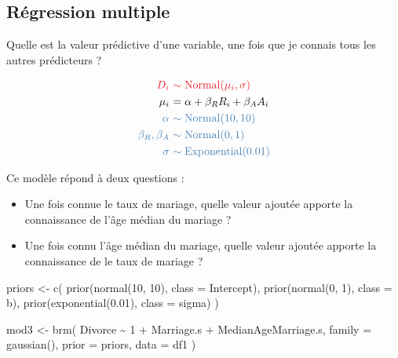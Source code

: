 \documentclass[
  a4paper,11pt,twoside,onecolumn,openright,final,oldfontcommands]{memoir}
\newenvironment{Shaded}{\begin{snugshade}}{\end{snugshade}}
\newcommand{\AttributeTok}[1]{\textcolor[rgb]{0.77,0.63,0.00}{#1}}
\newcommand{\DecValTok}[1]{\textcolor[rgb]{0.00,0.00,0.81}{#1}}
\newcommand{\FloatTok}[1]{\textcolor[rgb]{0.00,0.00,0.81}{#1}}
\newcommand{\FunctionTok}[1]{\textcolor[rgb]{0.00,0.00,0.00}{#1}}
\newcommand{\NormalTok}[1]{#1}
\newcommand{\OtherTok}[1]{\textcolor[rgb]{0.56,0.35,0.01}{#1}}
\newcommand{\SpecialCharTok}[1]{\textcolor[rgb]{0.00,0.00,0.00}{#1}}
\providecommand{\tightlist}{%
  \setlength{\itemsep}{0pt}\setlength{\parskip}{0pt}}
\theoremstyle{definition}
\theoremstyle{definition}
\theoremstyle{definition}
\theoremstyle{definition}
\theoremstyle{remark}
\begin{document}
\hypertarget{ruxe9gression-multiple-1}{%
\subsection{Régression multiple}\label{ruxe9gression-multiple-1}}

Quelle est la valeur prédictive d'une variable, une fois que je connais tous les autres prédicteurs ?

\[
\begin{aligned}
\color{orangered}{D_{i}} \ &\color{orangered}{\sim \mathrm{Normal}(\mu_{i}, \sigma)} \\
\color{black}{\mu_{i}} \ &\color{black}{= \alpha + \beta_{R}R_{i} + \beta_{A} A_{i}} \\
\color{steelblue}{\alpha} \ &\color{steelblue}{\sim \mathrm{Normal}(10, 10)} \\
\color{steelblue}{\beta_{R}, \beta_{A}} \ &\color{steelblue}{\sim \mathrm{Normal}(0, 1)} \\
\color{steelblue}{\sigma} \ &\color{steelblue}{\sim \mathrm{Exponential}(0.01)} \\
\end{aligned}
\]

Ce modèle répond à deux questions :

\begin{itemize}
\tightlist
\item
  Une fois connue le taux de mariage, quelle valeur ajoutée apporte la connaissance de l'âge médian du mariage ?
\item
  Une fois connu l'âge médian du mariage, quelle valeur ajoutée apporte la connaissance de le taux de mariage ?
\end{itemize}

\begin{Shaded}
\begin{Highlighting}[]
\NormalTok{priors }\OtherTok{\textless{}{-}} \FunctionTok{c}\NormalTok{(}
  \FunctionTok{prior}\NormalTok{(}\FunctionTok{normal}\NormalTok{(}\DecValTok{10}\NormalTok{, }\DecValTok{10}\NormalTok{), }\AttributeTok{class =}\NormalTok{ Intercept),}
  \FunctionTok{prior}\NormalTok{(}\FunctionTok{normal}\NormalTok{(}\DecValTok{0}\NormalTok{, }\DecValTok{1}\NormalTok{), }\AttributeTok{class =}\NormalTok{ b),}
  \FunctionTok{prior}\NormalTok{(}\FunctionTok{exponential}\NormalTok{(}\FloatTok{0.01}\NormalTok{), }\AttributeTok{class =}\NormalTok{ sigma)}
\NormalTok{  )}

\NormalTok{mod3 }\OtherTok{\textless{}{-}} \FunctionTok{brm}\NormalTok{(}
\NormalTok{  Divorce }\SpecialCharTok{\textasciitilde{}} \DecValTok{1} \SpecialCharTok{+}\NormalTok{ Marriage.s }\SpecialCharTok{+}\NormalTok{ MedianAgeMarriage.s,}
  \AttributeTok{family =} \FunctionTok{gaussian}\NormalTok{(),}
  \AttributeTok{prior =}\NormalTok{ priors,}
  \AttributeTok{data =}\NormalTok{ df1}
\NormalTok{  )}
\end{Highlighting}
\end{Shaded}
\end{document}
